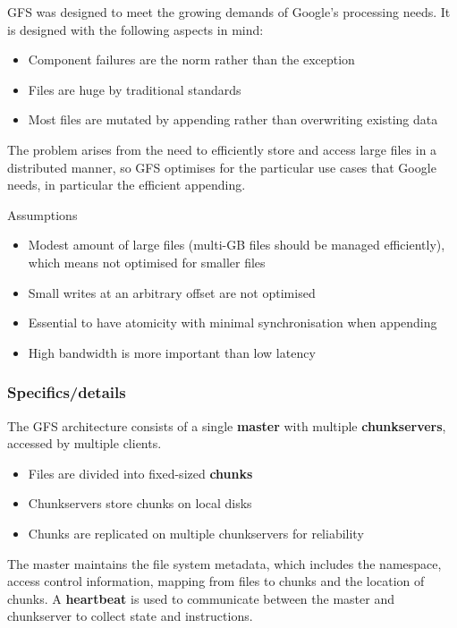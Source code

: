 \documentclass{sty/SizheArticle}
\begin{document}
GFS was designed to meet the growing demands of Google's processing needs.
It is designed with the following aspects in mind:
\begin{itemize}
\item Component failures are the norm rather than the exception
\item Files are huge by traditional standards
\item Most files are mutated by appending rather than overwriting existing data
\end{itemize}
The problem arises from the need to efficiently store and access large files
in a distributed manner, so GFS optimises for the particular use cases that
Google needs, in particular the efficient appending.

Assumptions
\begin{itemize}
\item Modest amount of large files (multi-GB files should be managed efficiently),
which means not optimised for smaller files
\item Small writes at an arbitrary offset are not optimised
\item Essential to have atomicity with minimal synchronisation when appending
\item High bandwidth is more important than low latency
\end{itemize}

\subsubsection{Specifics/details}

The GFS architecture consists of a single \textbf{master} with multiple
\textbf{chunkservers}, accessed by multiple clients.
\begin{itemize}
\item Files are divided into fixed-sized \textbf{chunks}
\item Chunkservers store chunks on local disks
\item Chunks are replicated on multiple chunkservers for reliability
\end{itemize}
The master maintains the file system metadata, which includes the namespace,
access control information, mapping from files to chunks and the location
of chunks. A \textbf{heartbeat} is used to communicate between the master
and chunkserver to collect state and instructions.
\end{document}
